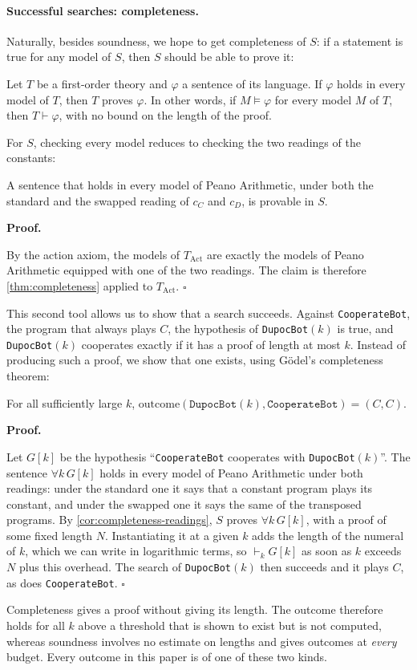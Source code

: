 \documentclass[twoside,11pt]{article}
\renewcommand{\BlackBox}{\ensuremath{\square}}
\renewenvironment{proof}[1][Proof]{%
  \par\noindent\textbf{#1.}\enspace\ignorespaces
}{%
  \ifhmode\unskip\nobreak\hfill\quad\else\noindent\hfill\fi
  \BlackBox\par\addvspace{2mm}%
}
\begin{document}
\paragraph{Successful searches: completeness.} Naturally, besides soundness, we hope to get completeness of $S$: if a statement is true for any model of $S$, then $S$ should be able to prove it:
\begin{theorem}
\label{thm:completeness}
Let $T$ be a first-order theory and $\varphi$ a sentence of its language. If $\varphi$ holds in every model of $T$, then $T$ proves $\varphi$. In other words, if $M \models \varphi$ for every model $M$ of $T$, then $T \vdash \varphi$, with no bound on the length of the proof.
\end{theorem}
For $S$, checking every model reduces to checking the two readings of the constants:
\begin{corollary}
\label{cor:completeness-readings}
A sentence that holds in every model of Peano Arithmetic, under both the standard and the swapped reading of $c_C$ and $c_D$, is provable in $S$.
\end{corollary}
\begin{proof}
By the action axiom, the models of $T_{\mathrm{Act}}$ are exactly the models of Peano Arithmetic equipped with one of the two readings. The claim is therefore \cref{thm:completeness} applied to $T_{\mathrm{Act}}$.
\end{proof}

This second tool allows us to show that a search succeeds. Against \texttt{CooperateBot}, the program that always plays $C$, the hypothesis of \texttt{DupocBot}$(k)$ is true, and \texttt{DupocBot}$(k)$ cooperates exactly if it has a proof of length at most $k$. Instead of producing such a proof, we show that one exists, using Gödel's completeness theorem:
\begin{proposition}\label{prop:dupoc-coop}
For all sufficiently large $k$, $\mathrm{outcome}(\texttt{DupocBot}(k), \texttt{CooperateBot}) = (C, C)$.
\end{proposition}
\begin{proof}
Let $G[k]$ be the hypothesis \enquote{\texttt{CooperateBot} cooperates with \texttt{DupocBot}$(k)$}. The sentence $\forall k\, G[k]$ holds in every model of Peano Arithmetic under both readings: under the standard one it says that a constant program plays its constant, and under the swapped one it says the same of the transposed programs. By \cref{cor:completeness-readings}, $S$ proves $\forall k\, G[k]$, with a proof of some fixed length $N$. Instantiating it at a given $k$ adds the length of the numeral of $k$, which we can write in logarithmic terms, so $\vdash_k G[k]$ as soon as $k$ exceeds $N$ plus this overhead. The search of \texttt{DupocBot}$(k)$ then succeeds and it plays $C$, as does \texttt{CooperateBot}.
\end{proof}
Completeness gives a proof without giving its length. The outcome therefore holds for all $k$ above a threshold that is shown to exist but is not computed, whereas soundness involves no estimate on lengths and gives outcomes at \emph{every} budget. Every outcome in this paper is of one of these two kinds.
\end{document}
